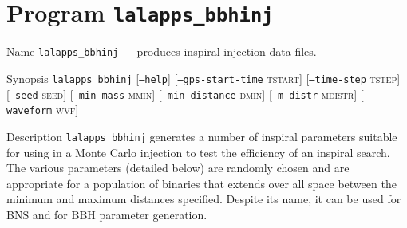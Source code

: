 \section{Program \texttt{lalapps\_bbhinj}}
\label{program:lalapps-bbhinj}

\begin{entry}
\item[Name]
\verb$lalapps_bbhinj$ --- produces inspiral injection data files.

\item[Synopsis]
\verb$lalapps_bbhinj$ \newline
%
[\texttt{--help}]\newline
%
[\texttt{--gps-start-time} \textsc{tstart}]\newline
%
[\texttt{--time-step} \textsc{tstep}] \newline
%
[\texttt{--seed} \textsc{seed}]\newline
%
[\texttt{--min-mass} \textsc{mmin}]  \newline
%
[\texttt{--min-distance} \textsc{dmin}]  \newline
%
[\texttt{--m-distr} \textsc{mdistr}]  \newline
%
[\texttt{--waveform} \textsc{wvf}] \newline
%


\item[Description] 
\verb$lalapps_bbhinj$
generates a number of inspiral  parameters suitable  for using in a Monte
Carlo injection to test the efficiency of an inspiral search.  The  various
parameters (detailed  below)  are randomly chosen and are appropriate for
a population of binaries that extends over all space between
the minimum and maximum distances specified.
Despite its name, it can be used for BNS and for BBH parameter generation.


\end{entry}

